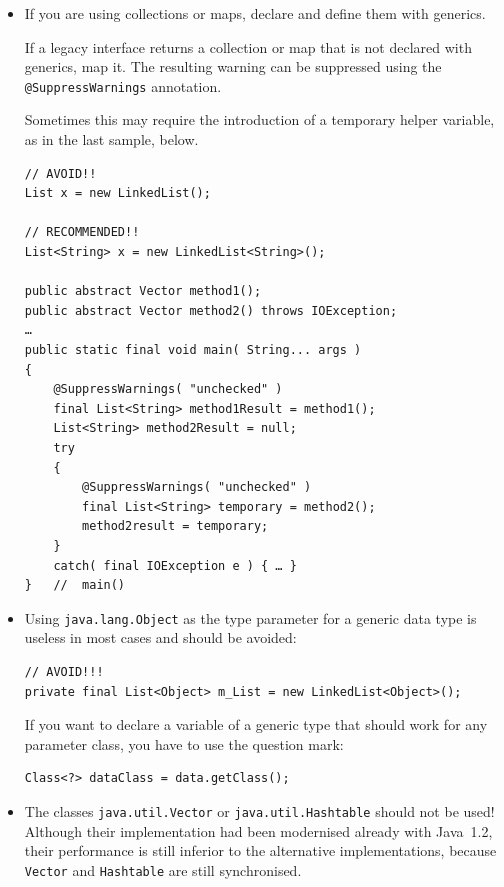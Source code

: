 \documentclass[11pt,a4paper, titlepage, parskip=half, headsepline, footsepline, cleardoublepage=current, headheight=1cm]{scrbook}
\begin{document}
\begin{itemize}
{In most cases, you can use a lambda instead of an anonymous class.}

\item{If you are using collections or maps, declare and define them with generics.

If a legacy interface returns a collection or map that is not declared with generics, map it. The resulting warning can be suppressed using the \lstinline|@SuppressWarnings|\autocite{ORACLE_DOC_SUPPRESSWARNINGS_ANNOTATION} annotation.

Sometimes this may require the introduction of a temporary helper variable, as in the last sample, below.

\begin{lstlisting}
// AVOID!!
List x = new LinkedList(); 

// RECOMMENDED!!
List<String> x = new LinkedList<String>(); 

public abstract Vector method1();
public abstract Vector method2() throws IOException;
…
public static final void main( String... args )
{
    @SuppressWarnings( "unchecked" )
    final List<String> method1Result = method1();
    List<String> method2Result = null;
    try
    {
        @SuppressWarnings( "unchecked" )
        final List<String> temporary = method2();
        method2result = temporary;
    }
    catch( final IOException e ) { … }
}   //  main()
\end{lstlisting}}

\item{Using \lstinline|java.lang.Object| as the type parameter for a generic data type is useless in most cases and should be avoided:
\begin{lstlisting}
// AVOID!!!
private final List<Object> m_List = new LinkedList<Object>();
\end{lstlisting}
If you want to declare a variable of a generic type that should work for any parameter class, you have to use the question mark:
\begin{lstlisting}
Class<?> dataClass = data.getClass();
\end{lstlisting}}

\item{The classes \lstinline|java.util.Vector|\autocite{ORACLE_DOC_VECTOR_CLASS} or \lstinline|java.util.Hashtable|\autocite{ORACLE_DOC_HASHTABLE_CLASS} should not be used! Although their implementation had been modernised already with Java~1.2, their performance is still inferior to the alternative implementations, because \lstinline|Vector| and \lstinline|Hashtable| are still synchronised.

}
\end{itemize}
\end{document}
